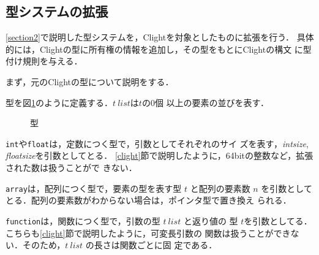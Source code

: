 \subsection{型システムの拡張}
\ref{section2}で説明した型システムを，Clightを対象としたものに拡張を行う．
具体的には，Clightの型に所有権の情報を追加し，その型をもとにClightの構文
に型付け規則を与える．

まず，元のClightの型について説明をする．

\begin{definition}[型]
  型を図\ref{clight_type}のように定義する．$t\ \mathit{list}$は$t$の$0$個
  以上の要素の並びを表す．
\end{definition}
\begin{figure}[htbp]
  \centering
  \caption{型}
  \label{clight_type}
\end{figure}

\texttt{int}や\texttt{float}は，定数につく型で，引数としてそれぞれのサイ
ズを表す，\textit{intsize}, \textit{floatsize}を引数としてとる．
\ref{clight}節で説明したように，64bitの整数など，拡張された数は扱うことがで
きない．

\texttt{array}は，配列につく型で，要素の型を表す型 $t$ と配列の要素数
$n$ を引数としてとる．配列の要素数がわからない場合は，ポインタ型で置き換え
られる．

\texttt{function}は，関数につく型で，引数の型 $t\ \mathit{list}$ と返り値の
型 $t$を引数としてる．こちらも\ref{clight}節で説明したように，可変長引数の
関数は扱うことができない．そのため，$t\ \mathit{list}$ の長さは関数ごとに固
定である．

